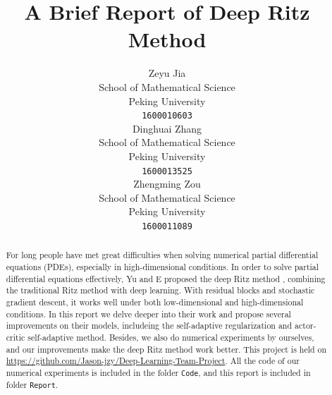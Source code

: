 \documentclass{article}
\title{A Brief Report of Deep Ritz Method}
\author{
  Zeyu Jia\\School of Mathematical Science\\Peking University\\ \texttt{1600010603} \\
  \And
  Dinghuai Zhang\\School of Mathematical Science\\Peking University\\ \texttt{1600013525}\\
  \And
  Zhengming Zou\\School of Mathematical Science\\Peking University \\ \texttt{1600011089}
}
\begin{document}
\maketitle

\begin{abstract}
\par For long people have met great difficulties when solving numerical partial differential equations (PDEs), especially in high-dimensional conditions. In order to solve partial differential equations effectively, Yu and E proposed the deep Ritz method \cite{yu2017deep}, combining the traditional Ritz method with deep learning. With residual blocks and stochastic gradient descent, it works well under both low-dimensional and high-dimensional conditions. In this report we delve deeper into their work and propose several improvements on their models, includeing the self-adaptive regularization and actor-critic self-adaptive method. Besides, we also do numerical experiments by ourselves, and our improvements make the deep Ritz method work better. This project is held on \url{https://github.com/Jason-jzy/Deep-Learning-Team-Project}. All the code of our numerical experiments is included in the folder \verb"Code", and this report is included in folder \verb"Report".
\end{abstract}
\end{document}
